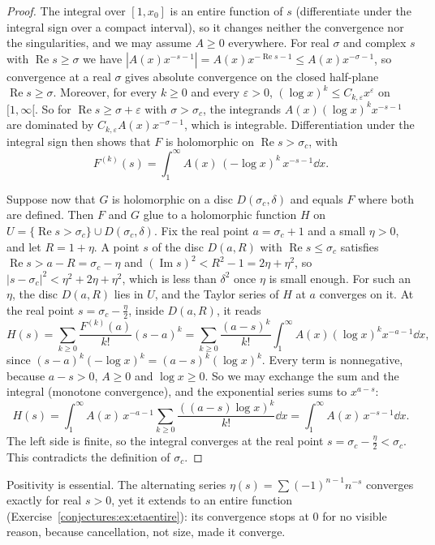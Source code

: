 \begin{proof}
The integral over $[1,x_0]$ is an entire function of $s$ (differentiate under the integral sign over a compact interval), so it changes neither the
convergence nor the singularities, and we may assume $A\ge0$ everywhere. For real $\sigma$ and complex $s$ with $\operatorname{Re}s\ge\sigma$ we have
$|A(x)x^{-s-1}|=A(x)x^{-\operatorname{Re}s-1}\le A(x)x^{-\sigma-1}$, so convergence at a real $\sigma$ gives absolute convergence on the closed half-plane
$\operatorname{Re}s\ge\sigma$. Moreover, for every $k\ge0$ and every $\varepsilon>0$, $(\log x)^k\le C_{k,\varepsilon}x^\varepsilon$ on $[1,\infty[$. So for
$\operatorname{Re}s\ge\sigma+\varepsilon$ with $\sigma>\sigma_c$, the integrands $A(x)(\log x)^kx^{-s-1}$ are dominated by $C_{k,\varepsilon}A(x)x^{-\sigma-1}$,
which is integrable. Differentiation under the integral sign then shows that $F$ is holomorphic on $\operatorname{Re}s>\sigma_c$, with
\[
F^{(k)}(s)=\int_1^\infty A(x)\,(-\log x)^k\,x^{-s-1}\dd x.
\]

Suppose now that $G$ is holomorphic on a disc $D(\sigma_c,\delta)$ and equals $F$ where both are defined. Then $F$ and $G$ glue to a holomorphic function $H$ on
$U=\{\operatorname{Re}s>\sigma_c\}\cup D(\sigma_c,\delta)$. Fix the real point $a=\sigma_c+1$ and a small $\eta>0$, and let $R=1+\eta$. A point $s$ of the disc
$D(a,R)$ with $\operatorname{Re}s\le\sigma_c$ satisfies $\operatorname{Re}s>a-R=\sigma_c-\eta$ and $(\operatorname{Im}s)^2<R^2-1=2\eta+\eta^2$, so
$|s-\sigma_c|^2<\eta^2+2\eta+\eta^2$, which is less than $\delta^2$ once $\eta$ is small enough. For such an $\eta$, the disc $D(a,R)$ lies in $U$, and the Taylor
series of $H$ at $a$ converges on it. At the real point $s=\sigma_c-\frac\eta2$, inside $D(a,R)$, it reads
\[
H(s)=\sum_{k\ge0}\frac{F^{(k)}(a)}{k!}(s-a)^k=\sum_{k\ge0}\frac{(a-s)^k}{k!}\int_1^\infty A(x)(\log x)^kx^{-a-1}\dd x,
\]
since $(s-a)^k(-\log x)^k=(a-s)^k(\log x)^k$. Every term is nonnegative, because $a-s>0$, $A\ge0$ and $\log x\ge0$. So we may exchange the sum and the integral
(monotone convergence), and the exponential series sums to $x^{a-s}$:
\[
H(s)=\int_1^\infty A(x)\,x^{-a-1}\sum_{k\ge0}\frac{((a-s)\log x)^k}{k!}\dd x=\int_1^\infty A(x)\,x^{-s-1}\dd x.
\]
The left side is finite, so the integral converges at the real point $s=\sigma_c-\frac\eta2<\sigma_c$. This contradicts the definition of $\sigma_c$.
\end{proof}

Positivity is essential. The alternating series $\eta(s)=\sum(-1)^{n-1}n^{-s}$ converges exactly for real $s>0$, yet it extends to an entire function
(Exercise~\ref{conjectures:ex:etaentire}): its convergence stops at $0$ for no visible reason, because cancellation, not size, made it converge.

